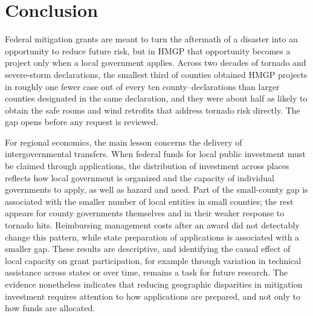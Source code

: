 \section{Conclusion}
\label{sec:conclusion}

Federal mitigation grants are meant to turn the aftermath of a disaster into an opportunity to reduce future risk, but in HMGP that opportunity becomes a project only when a local government applies. Across two decades of tornado and severe-storm declarations, the smallest third of counties obtained HMGP projects in roughly one fewer case out of every ten county--declarations than larger counties designated in the same declaration, and they were about half as likely to obtain the safe rooms and wind retrofits that address tornado risk directly. The gap opens before any request is reviewed.

For regional economics, the main lesson concerns the delivery of intergovernmental transfers. When federal funds for local public investment must be claimed through applications, the distribution of investment across places reflects how local government is organized and the capacity of individual governments to apply, as well as hazard and need. Part of the small-county gap is associated with the smaller number of local entities in small counties; the rest appears for county governments themselves and in their weaker response to tornado hits. Reimbursing management costs after an award did not detectably change this pattern, while state preparation of applications is associated with a smaller gap. These results are descriptive, and identifying the causal effect of local capacity on grant participation, for example through variation in technical assistance across states or over time, remains a task for future research. The evidence nonetheless indicates that reducing geographic disparities in mitigation investment requires attention to how applications are prepared, and not only to how funds are allocated.

